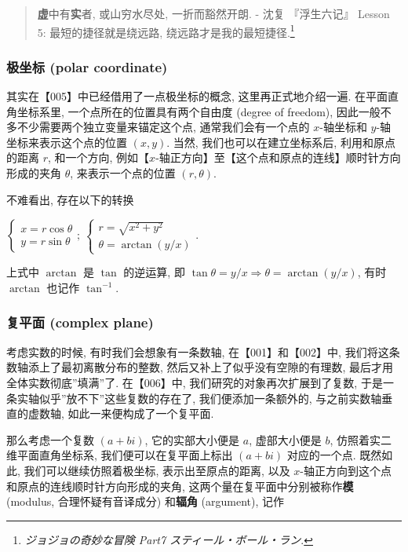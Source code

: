 \begin{quote}
\textbf{虚}中有\textbf{实}者, 或山穷水尽处, 一折而豁然开朗. - 沈复
『浮生六记』 Lesson 5: 最短的捷径就是绕远路,
绕远路才是我的最短捷径.\footnote{\emph{ジョジョの奇妙な冒険 Part7
  スティール・ボール・ラン}.}
\end{quote}

\hypertarget{ux6781ux5750ux6807-polar-coordinate}{%
\subsubsection{极坐标 (polar
coordinate)}\label{ux6781ux5750ux6807-polar-coordinate}}

其实在【005】中已经借用了一点极坐标的概念, 这里再正式地介绍一遍.
在平面直角坐标系里, 一个点所在的位置具有两个自由度 (degree of freedom),
因此一般不多不少需要两个独立变量来锚定这个点, 通常我们会有一个点的
\(x\)-轴坐标和 \(y\)-轴坐标来表示这个点的位置 \((x,y)\). 当然,
我们也可以在建立坐标系后, 利用和原点的距离 \(r\), 和一个方向,
例如【\(x\)-轴正方向】至【这个点和原点的连线】顺时针方向形成的夹角
\(\theta\), 来表示一个点的位置 \((r,\theta)\).

不难看出, 存在以下的转换

\(\begin{cases}x=r\cos\theta\\y=r\sin\theta\end{cases};\ \begin{cases}r=\sqrt{x^2+y^2}\\\theta=\arctan (y/x)\end{cases}.\)

上式中 \(\arctan\) 是 \(\tan\) 的逆运算, 即
\(\tan\theta=y/x\Rightarrow \theta=\arctan (y/x)\), 有时 \(\arctan\)
也记作 \(\tan^{-1}\).

\hypertarget{ux590dux5e73ux9762-complex-plane}{%
\subsubsection{复平面 (complex
plane)}\label{ux590dux5e73ux9762-complex-plane}}

考虑实数的时候, 有时我们会想象有一条数轴, 在【001】和【002】中,
我们将这条数轴添上了最初离散分布的整数,
然后又补上了似乎没有空隙的有理数, 最后才用全体实数彻底''填满''了.
在【006】中, 我们研究的对象再次扩展到了复数,
于是一条实轴似乎''放不下''这些复数的存在了, 我们便添加一条额外的,
与之前实数轴垂直的虚数轴, 如此一来便构成了一个复平面.

那么考虑一个复数 \((a+bi)\), 它的实部大小便是 \(a\), 虚部大小便是 \(b\),
仿照着实二维平面直角坐标系, 我们便可以在复平面上标出 \((a+bi)\)
对应的一个点. 既然如此, 我们可以继续仿照着极坐标, 表示出至原点的距离,
以及 \(x\)-轴正方向到这个点和原点的连线顺时针方向形成的夹角,
这两个量在复平面中分别被称作\textbf{模} (modulus, 合理怀疑有音译成分)
和\textbf{辐角} (argument), 记作

